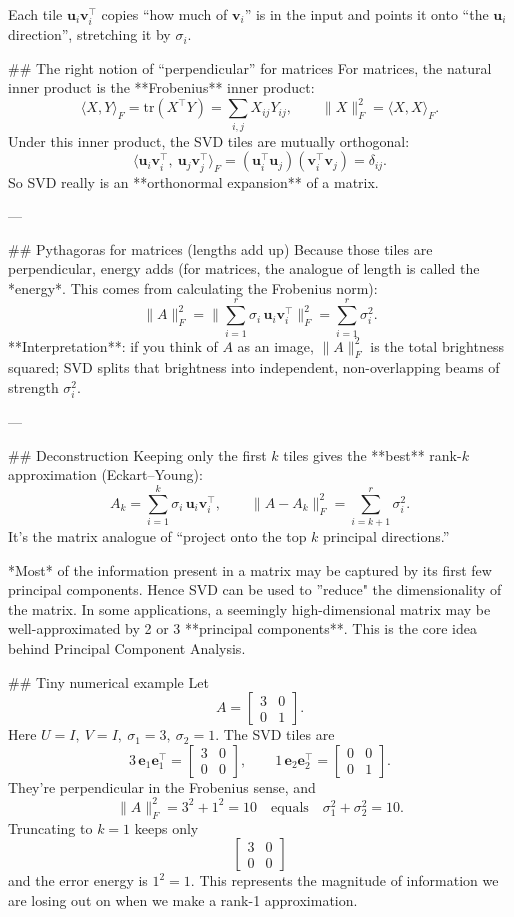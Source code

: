 Each tile $\mathbf{u}_i\mathbf{v}_i^\top$ copies “how much of $\mathbf{v}_i$” is in the input and points it onto “the $\mathbf{u}_i$ direction”, stretching it by $\sigma_i$. 

## The right notion of “perpendicular” for matrices
For matrices, the natural inner product is the **Frobenius** inner product:
$$
\langle X,Y\rangle_F=\mathrm{tr}(X^\top Y)=\sum_{i,j}X_{ij}Y_{ij},
\qquad
\|X\|_F^2=\langle X,X\rangle_F.
$$
Under this inner product, the SVD tiles are mutually orthogonal:
$$
\big\langle \mathbf{u}_i\mathbf{v}_i^\top,\ \mathbf{u}_j\mathbf{v}_j^\top\big\rangle_F
=(\mathbf{u}_i^\top\mathbf{u}_j)(\mathbf{v}_i^\top\mathbf{v}_j)=\delta_{ij}.
$$
So SVD really is an **orthonormal expansion** of a matrix.

---

## Pythagoras for matrices (lengths add up)
Because those tiles are perpendicular, energy adds (for matrices, the analogue of length is called the *energy*. This comes from calculating the Frobenius norm):
$$
\|A\|_F^2
=\Big\|\sum_{i=1}^r \sigma_i\,\mathbf{u}_i\mathbf{v}_i^\top\Big\|_F^2
=\sum_{i=1}^r \sigma_i^2.
$$
**Interpretation**: if you think of $A$ as an image, $\|A\|_F^2$ is the total brightness squared; SVD splits that brightness into independent, non-overlapping beams of strength $\sigma_i^2$.

---

## Deconstruction
Keeping only the first \(k\) tiles gives the **best** rank-\(k\) approximation (Eckart–Young):
$$
A_k=\sum_{i=1}^k \sigma_i\,\mathbf{u}_i\mathbf{v}_i^\top,
\qquad
\|A-A_k\|_F^2=\sum_{i=k+1}^r \sigma_i^2.
$$
It’s the matrix analogue of “project onto the top $k$ principal directions.”

*Most* of the information present in a matrix may be captured by its first few principal components. Hence SVD can be used to ''reduce" the dimensionality of the matrix. In some applications, a seemingly high-dimensional matrix may be well-approximated by 2 or 3 **principal components**. This is the core idea behind Principal Component Analysis. 


##  Tiny numerical example
Let
$$
A=\begin{bmatrix}3&0\\[2pt]0&1\end{bmatrix}.
$$
Here $U=I,\ V=I,\ \sigma_1=3,\ \sigma_2=1$. The SVD tiles are
$$
3\,\mathbf{e}_1\mathbf{e}_1^\top=
\begin{bmatrix}3&0\\0&0\end{bmatrix},
\qquad
1\,\mathbf{e}_2\mathbf{e}_2^\top=
\begin{bmatrix}0&0\\0&1\end{bmatrix}.
$$
They’re perpendicular in the Frobenius sense, and
$$
\|A\|_F^2 = 3^2+1^2 = 10
\quad\text{equals}\quad
\sigma_1^2+\sigma_2^2=10.
$$
Truncating to \(k=1\) keeps only $$\begin{bmatrix}3&0\\0&0
\end{bmatrix}$$ and the error energy is $1^2=1$. This represents the magnitude of information we are losing out on when we make a rank-1 approximation.


